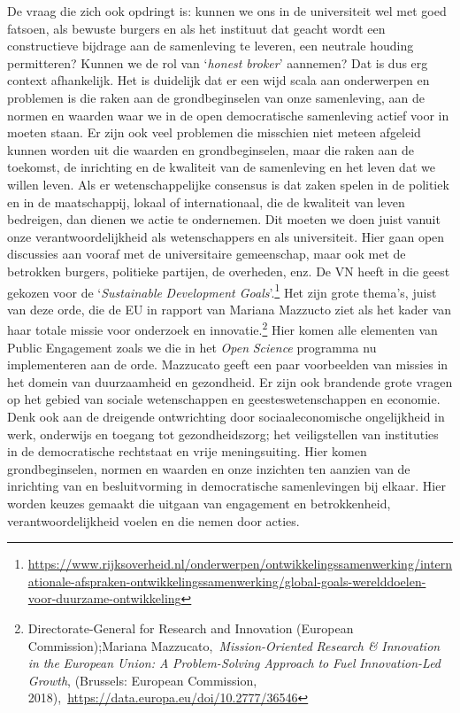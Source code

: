 \documentclass[smallauthor, chapterhaspagenum, nochapterinheader, pagenuminheader,  bigchapnum,medium2, tocpages,  garamond, titleinheader]{jote-book}
\begin{document}
	De vraag die zich ook opdringt is: kunnen we ons in de universiteit wel met goed fatsoen, als bewuste burgers en als het instituut dat geacht wordt een constructieve bijdrage aan de samenleving te leveren, een neutrale houding permitteren? Kunnen we de rol van ‘\emph{honest}\emph{ broker}' aannemen? Dat is dus erg context afhankelijk. Het is duidelijk dat er een wijd scala aan onderwerpen en problemen is die raken aan de grondbeginselen van onze samenleving, aan de normen en waarden waar we in de open democratische samenleving actief voor in moeten staan. Er zijn ook veel problemen die misschien niet meteen afgeleid kunnen worden uit die waarden en grondbeginselen, maar die raken aan de toekomst, de inrichting en de kwaliteit van de samenleving en het leven dat we willen leven. Als er wetenschappelijke consensus is dat zaken spelen in de politiek en in de maatschappij, lokaal of internationaal, die de kwaliteit van leven bedreigen, dan dienen we actie te ondernemen. Dit moeten we doen juist vanuit onze verantwoordelijkheid als wetenschappers en als universiteit. Hier gaan open discussies aan vooraf met de universitaire gemeenschap, maar ook met de betrokken burgers, politieke partijen, de overheden, enz. De VN heeft in die geest gekozen voor de ‘\emph{Sustainable}\emph{ Development Goals}'.\footnote{\href{https://www.rijksoverheid.nl/onderwerpen/ontwikkelingssamenwerking/internationale-afspraken-ontwikkelingssamenwerking/global-goals-werelddoelen-voor-duurzame-ontwikkeling}{https://www.rijksoverheid.nl/onderwerpen/ontwikkelingssamenwerking/internationale-afspraken-ontwikkelingssamenwerking/global-goals-werelddoelen-voor-duurzame-ontwikkeling}} Het zijn grote thema's, juist van deze orde, die de EU in rapport van Mariana Mazzucto ziet als het kader van haar totale missie voor onderzoek en innovatie.\footnote{Directorate-General for Research and Innovation (European Commission);Mariana Mazzucato, \emph{Mission-}\emph{Oriented}\emph{ Research \& }\emph{Innovation}\emph{ in }\emph{the}\emph{ European Union: A}\emph{ }\emph{Problem-Solving}\emph{ Approach }\emph{to}\emph{ }\emph{Fuel}\emph{ }\emph{Innovation}\emph{-Led }\emph{Growth}, (Brussels: European Commission, 2018), \href{https://ewuu.nl}{https://data.europa.eu/doi/10.2777/36546}} Hier komen alle elementen van Public Engagement zoals we die in het \emph{Open }\emph{Science} programma nu implementeren aan de orde. Mazzucato geeft een paar voorbeelden van missies in het domein van duurzaamheid en gezondheid. Er zijn ook brandende grote vragen op het gebied van sociale wetenschappen en geesteswetenschappen en economie. Denk ook aan de dreigende ontwrichting door sociaaleconomische ongelijkheid in werk, onderwijs en toegang tot gezondheidszorg; het veiligstellen van instituties in de democratische rechtstaat en vrije meningsuiting. Hier komen grondbeginselen, normen en waarden en onze inzichten ten aanzien van de inrichting van en besluitvorming in democratische samenlevingen bij elkaar. Hier worden keuzes gemaakt die uitgaan van engagement en betrokkenheid, verantwoordelijkheid voelen en die nemen door acties.
\end{document}
